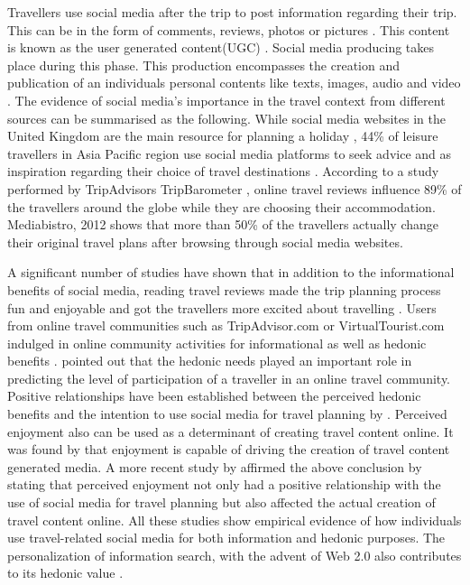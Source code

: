 Travellers use social media after the trip to post information regarding their trip. This can be in the form of comments, reviews, photos or pictures \cite{fotis2012social}\cite{parra2012travellers}. This content is known as the user generated content(UGC) \cite{simms2012online}. Social media producing takes place during this phase. This production encompasses the creation and publication of an individual\textquotesingle s personal contents like texts, images, audio and video \cite{Shao, 2009}. The evidence of social media’s importance in the travel context from different sources can be summarised as the following. While social media websites in the United Kingdom are the main resource for planning a holiday \cite{World Travel Market, 2013}, 44\% of leisure travellers in Asia Pacific region use social media platforms to seek advice and as inspiration regarding their choice of travel destinations \cite{eMarketer, 2013}. According to a study performed by TripAdvisor\textquotesingle s TripBarometer \cite{2014b}, online travel reviews influence 89\% of the travellers around the globe while they are choosing their accommodation. Mediabistro, 2012 shows that more than 50\% of the travellers actually change their original travel plans after browsing through social media websites.

A significant number of studies have shown that in addition to the informational benefits of social media, reading travel reviews made the trip planning process fun and enjoyable and got the travellers more excited about travelling \cite{10.1007/978-3-211-77280-5_4}\cite{gretzel2007online} \cite{parra2012travellers}. Users from online travel communities such as TripAdvisor.com or VirtualTourist.com indulged in online community activities for informational as well as hedonic benefits \cite{chung2008web}. \cite{doi:10.1177/0047287503258824} pointed out that the hedonic needs played an important role in predicting the level of participation of a traveller in an online travel community. Positive relationships have been established between the perceived hedonic benefits and the intention to use social media for travel planning by \cite{ayeh2013predicting}.  Perceived enjoyment also can be used as a determinant of creating travel content online. It was found by \cite{YOO2011609} that enjoyment is capable of driving the creation of travel content generated media. A more recent study by \cite{doi:10.1080/10548408.2013.751237} affirmed the above conclusion by stating that perceived enjoyment not only had a positive relationship with the use of social media for travel planning but also affected the actual creation of travel content online.
All these studies show empirical evidence of how individuals use travel-related social media for both information and hedonic purposes. The personalization of information search, with the advent of Web 2.0 also contributes to its hedonic value \cite{doi:10.1080/14616688.2012.762542}.

